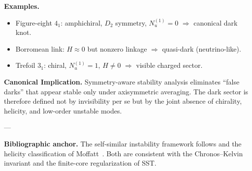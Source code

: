 \documentclass[10pt,reprint,aps,onecolumn,nofootinbib]{revtex4-2}
\begin{document}
    \textbf{Examples.}
    \begin{itemize}
        \item Figure-eight \(4_1\): amphichiral, $D_2$ symmetry, $N_u^{(1)}=0$
        $\Rightarrow$ canonical dark knot.
        \item Borromean link: $H\approx0$ but nonzero linkage
        $\Rightarrow$ quasi-dark (neutrino-like).
        \item Trefoil \(3_1\): chiral, $N_u^{(1)}=1$, $H\!\neq\!0$
        $\Rightarrow$ visible charged sector.
    \end{itemize}

    \textbf{Canonical Implication.}
    Symmetry-aware stability analysis eliminates “false darks” that appear stable only under
    axisymmetric averaging.  The dark sector is therefore defined not by invisibility per se
    but by the joint absence of chirality, helicity, and low-order unstable modes.

    ---

    \textbf{Bibliographic anchor.}
    The self-similar instability framework follows
    \cite{WangEtAl2025UnstableSingularities} and the helicity classification
    of Moffatt~\cite{Moffatt1969}.  Both are consistent with the
    Chronos–Kelvin invariant and the finite-core regularization of SST.




\end{document}
